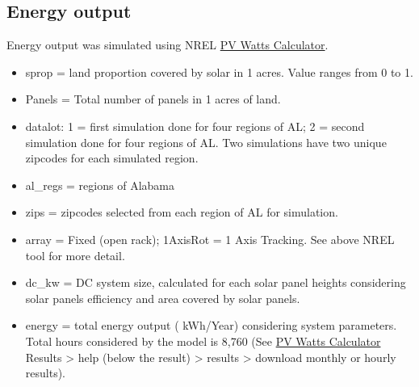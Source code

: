 \documentclass[
  letterpaper,
  DIV=11,
  numbers=noendperiod]{scrartcl}
\begin{document}
\subsection{Energy output}\label{energy-output}

Energy output was simulated using NREL
\href{https://pvwatts.nrel.gov/pvwatts.php}{PV Watts Calculator}.

\begin{itemize}
\item
  sprop = land proportion covered by solar in 1 acres. Value ranges from
  0 to 1.
\item
  Panels = Total number of panels in 1 acres of land.
\item
  datalot: 1 = first simulation done for four regions of AL; 2 = second
  simulation done for four regions of AL. Two simulations have two
  unique zipcodes for each simulated region.
\item
  al\_regs = regions of Alabama
\item
  zips = zipcodes selected from each region of AL for simulation.
\item
  array = Fixed (open rack); 1AxisRot = 1 Axis Tracking. See above NREL
  tool for more detail.
\item
  dc\_kw = DC system size, calculated for each solar panel heights
  considering solar panels efficiency and area covered by solar panels.
\item
  energy = total energy output ( kWh/Year) considering system
  parameters. Total hours considered by the model is 8,760 (See
  \href{https://pvwatts.nrel.gov/pvwatts.php}{PV Watts Calculator}
  Results \textgreater{} help (below the result) \textgreater{} results
  \textgreater{} download monthly or hourly results).
\end{itemize}
\end{document}
